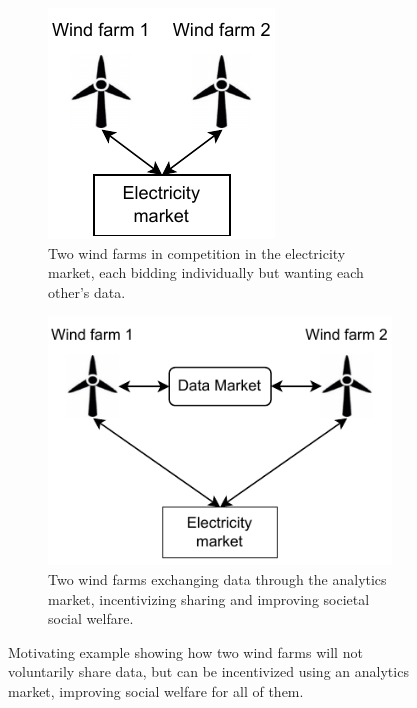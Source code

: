 \begin{figure}
  \centering
  \begin{subfigure}{.4\textwidth}
    \centering
    \includegraphics[width=.8\linewidth]{Pictures/wind_farm_double.pdf}
    \caption{Two wind farms in competition in the electricity market, each
    bidding individually but wanting each other's data.}
  \end{subfigure}%
  \hspace{1em}
\begin{subfigure}{.4\textwidth}
  \centering
  \includegraphics[width=.8\linewidth]{Pictures/wind_farms_two_with_market.pdf}
  \caption{Two wind farms exchanging data through the analytics market,
  incentivizing sharing and improving societal social welfare.}
\end{subfigure}%
  \caption{Motivating example showing how two wind farms will not voluntarily
  share data, but can be incentivized using an analytics market, improving
  social welfare for all of them.}
  \label{fig:wind_intro}
\end{figure}

